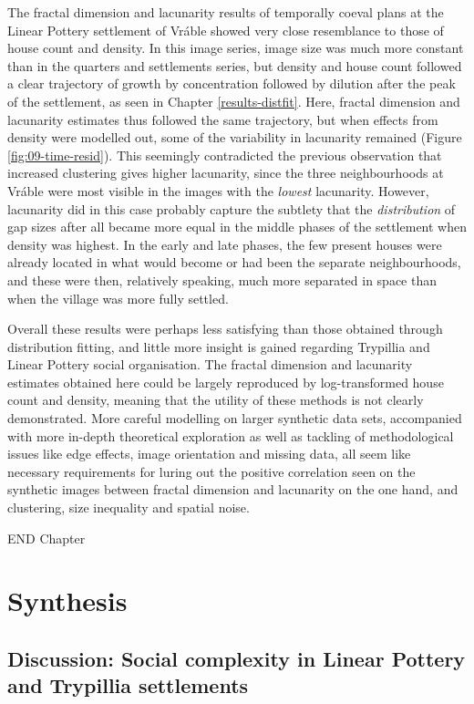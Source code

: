\documentclass[
  12pt,
  a4paper, twoside]{book}
\begin{document}
The fractal dimension and lacunarity results of temporally coeval plans at the Linear Pottery settlement of Vráble showed very close resemblance to those of house count and density. In this image series, image size was much more constant than in the quarters and settlements series, but density and house count followed a clear trajectory of growth by concentration followed by dilution after the peak of the settlement, as seen in Chapter \ref{results-distfit}. Here, fractal dimension and lacunarity estimates thus followed the same trajectory, but when effects from density were modelled out, some of the variability in lacunarity remained (Figure \ref{fig:09-time-resid}). This seemingly contradicted the previous observation that increased clustering gives higher lacunarity, since the three neighbourhoods at Vráble were most visible in the images with the \emph{lowest} lacunarity. However, lacunarity did in this case probably capture the subtlety that the \emph{distribution} of gap sizes after all became more equal in the middle phases of the settlement when density was highest. In the early and late phases, the few present houses were already located in what would become or had been the separate neighbourhoods, and these were then, relatively speaking, much more separated in space than when the village was more fully settled.

Overall these results were perhaps less satisfying than those obtained through distribution fitting, and little more insight is gained regarding Trypillia and Linear Pottery social organisation. The fractal dimension and lacunarity estimates obtained here could be largely reproduced by log-transformed house count and density, meaning that the utility of these methods is not clearly demonstrated. More careful modelling on larger synthetic data sets, accompanied with more in-depth theoretical exploration as well as tackling of methodological issues like edge effects, image orientation and missing data, all seem like necessary requirements for luring out the positive correlation seen on the synthetic images between fractal dimension and lacunarity on the one hand, and clustering, size inequality and spatial noise.

END Chapter

\hypertarget{part-synthesis}{%
\part{Synthesis}\label{part-synthesis}}

\hypertarget{disc-results}{%
\chapter{Discussion: Social complexity in Linear Pottery and Trypillia settlements}\label{disc-results}}
\end{document}
